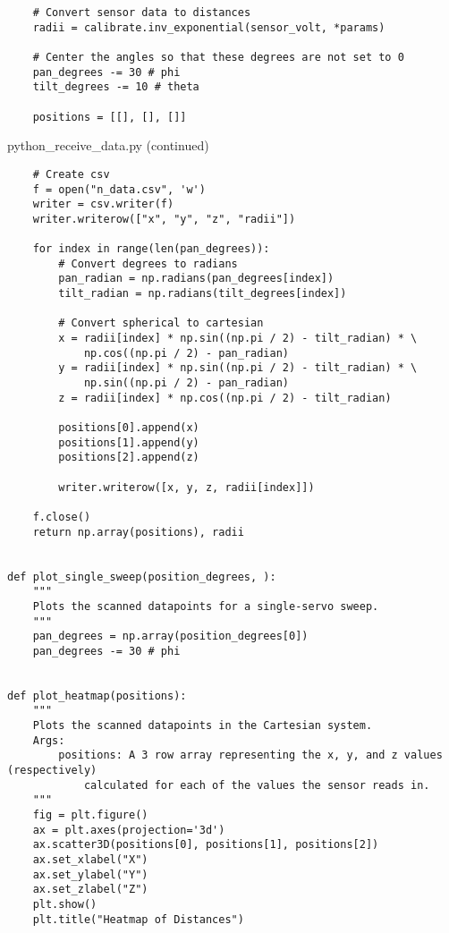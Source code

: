 \documentclass{article}
\begin{document}
\begin{tcolorbox}
\begin{verbatim}
    # Convert sensor data to distances
    radii = calibrate.inv_exponential(sensor_volt, *params)

    # Center the angles so that these degrees are not set to 0
    pan_degrees -= 30 # phi
    tilt_degrees -= 10 # theta

    positions = [[], [], []]
\end{verbatim}
\end{tcolorbox}

\begin{tcolorbox}
python\_receive\_data.py (continued)
\begin{verbatim}
    # Create csv
    f = open("n_data.csv", 'w')
    writer = csv.writer(f)
    writer.writerow(["x", "y", "z", "radii"])

    for index in range(len(pan_degrees)):
        # Convert degrees to radians
        pan_radian = np.radians(pan_degrees[index])
        tilt_radian = np.radians(tilt_degrees[index])

        # Convert spherical to cartesian
        x = radii[index] * np.sin((np.pi / 2) - tilt_radian) * \
            np.cos((np.pi / 2) - pan_radian)
        y = radii[index] * np.sin((np.pi / 2) - tilt_radian) * \
            np.sin((np.pi / 2) - pan_radian)
        z = radii[index] * np.cos((np.pi / 2) - tilt_radian)

        positions[0].append(x)
        positions[1].append(y)
        positions[2].append(z)

        writer.writerow([x, y, z, radii[index]])

    f.close()
    return np.array(positions), radii


def plot_single_sweep(position_degrees, ):
    """
    Plots the scanned datapoints for a single-servo sweep.
    """
    pan_degrees = np.array(position_degrees[0])
    pan_degrees -= 30 # phi


def plot_heatmap(positions):
    """
    Plots the scanned datapoints in the Cartesian system.
    Args:
        positions: A 3 row array representing the x, y, and z values (respectively)
            calculated for each of the values the sensor reads in.
    """
    fig = plt.figure()
    ax = plt.axes(projection='3d')
    ax.scatter3D(positions[0], positions[1], positions[2])
    ax.set_xlabel("X")
    ax.set_ylabel("Y")
    ax.set_zlabel("Z")
    plt.show()
    plt.title("Heatmap of Distances")
\end{verbatim}
\end{tcolorbox}
\end{document}
